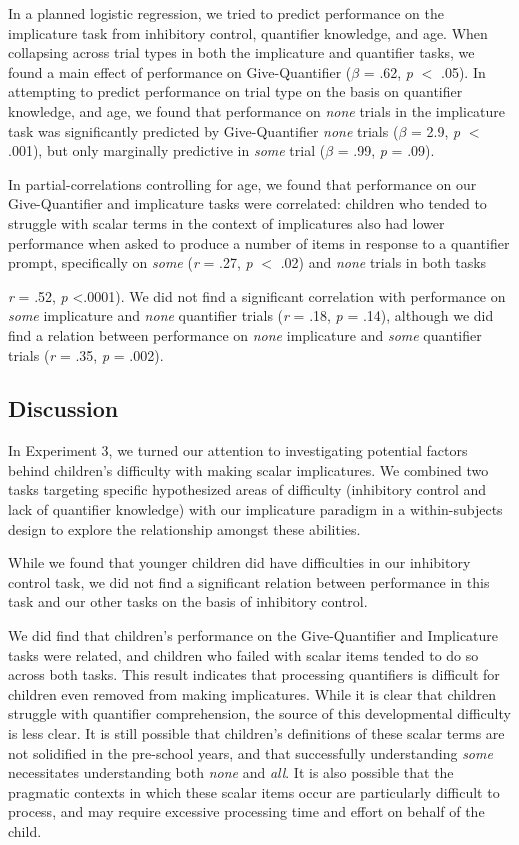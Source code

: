 \documentclass[man]{apa2}
\begin{document}
In a planned logistic regression, we tried to predict performance on the implicature task from inhibitory control, quantifier knowledge, and age. When collapsing across trial types in both the implicature and quantifier tasks, we found a main effect of performance on Give-Quantifier ($\beta$ = .62, \emph{p} $<$ .05). In attempting to predict performance on trial type on the basis on quantifier knowledge, and age, we found that performance on \emph{none} trials in the implicature task was significantly predicted by Give-Quantifier \emph{none} trials ($\beta$ = 2.9, \emph{p} $<$ .001), but only marginally predictive in \emph{some} trial ($\beta$ = .99, \emph{p} = .09). 

In partial-correlations controlling for age, we found that performance on our Give-Quantifier and implicature tasks were correlated: children who tended to struggle with scalar terms in the context of implicatures also had lower performance when asked to produce a number of items in response to a quantifier prompt, specifically on \textit{some}  (\textit{r} = .27, \textit{p} $<$ .02) and \textit{none} trials in both tasks {\textit{r} = .52, \textit{p} \textless .0001). We did not find a significant correlation with performance on \textit{some} implicature and \textit{none} quantifier trials (\textit{r} = .18, \textit{p} = .14), although we did find a relation between performance on \textit{none} implicature and \textit{some} quantifier trials (\textit{r} = .35, \textit{p} = .002). 



\subsection{Discussion}

In Experiment 3, we turned our attention to investigating potential factors behind children's difficulty with making scalar implicatures. We combined two tasks targeting specific hypothesized areas of difficulty (inhibitory control and lack of quantifier knowledge) with our implicature paradigm in a within-subjects design to explore the relationship amongst these abilities. 

While we found that younger children did have difficulties in our inhibitory control task, we did not find a significant relation between performance in this task and our other tasks on the basis of inhibitory control. 

We did find that children's performance on the Give-Quantifier and Implicature tasks were related, and children who failed with scalar items tended to do so across both tasks. This result indicates that processing quantifiers is difficult for children even removed from making implicatures. While it is clear that children struggle with quantifier comprehension, the source of this developmental difficulty is less clear. It is still possible that children's definitions of these scalar terms are not solidified in the pre-school years, and that successfully understanding \textit{some} necessitates understanding both \textit{none} and \textit{all}. It is also possible that the pragmatic contexts in which these scalar items occur are particularly difficult to process, and may require excessive processing time and effort on behalf of the child. 

}
\end{document}
